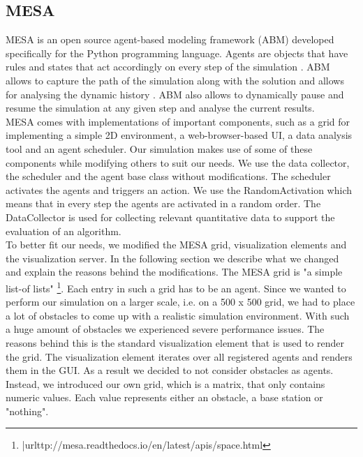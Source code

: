 \subsection{MESA}
MESA \cite{masad.2015} is an open source agent-based modeling framework (ABM) developed specifically for the Python programming language.  Agents are objects that have rules and states that act accordingly on every step of the simulation \cite{axtell.2000}. ABM allows to capture the path of the simulation along with the solution and allows for analysing the dynamic history \cite{axtell.2000}. ABM also allows to dynamically pause and resume the simulation at any given step and analyse the current results.\\
MESA comes with implementations of important components, such as a grid for implementing a simple 2D environment, a web-browser-based UI, a data analysis tool and an agent scheduler. Our simulation makes use of some of these components while modifying others to suit our needs. We use the data collector, the scheduler and the agent base class without modifications. The scheduler activates the agents and triggers an action. We use the RandomActivation which means that in every step the agents are activated in a random order. The DataCollector is used for collecting relevant quantitative data to support the evaluation of an algorithm.\\
To better fit our needs, we modified the MESA grid, visualization elements and the visualization server. In the following section we describe what we changed and explain the reasons behind the modifications.
The MESA grid is "a simple list-of lists" \footnote{|url{ttp://mesa.readthedocs.io/en/latest/apis/space.html}}. Each entry in such a grid has to be an agent. Since we wanted to perform our simulation on a larger scale, i.e. on a 500 x 500 grid, we had to place a lot of obstacles to come up with a realistic simulation environment. With such a huge amount of obstacles we experienced severe performance issues. The reasons behind this is the standard visualization element that is used to render the grid. The visualization element iterates over all registered agents and renders them in the GUI. As a result we decided to not consider obstacles as agents. Instead, we introduced our own grid, which is a matrix, that only contains numeric values. Each value represents either an obstacle, a base station or "nothing". 
 
